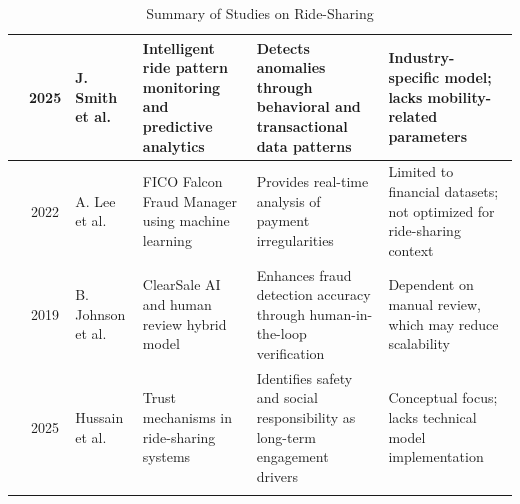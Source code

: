 \begin{longtable}{|c|c|l|
>{\raggedright\arraybackslash}p{3.2cm}|
>{\raggedright\arraybackslash}p{3.5cm}|
>{\raggedright\arraybackslash}p{3.5cm}|}
\cite{smith2025} & 2025 & J. Smith et al. &
Intelligent ride pattern monitoring and predictive analytics &
Detects anomalies through behavioral and transactional data patterns &
Industry-specific model; lacks mobility-related parameters \\ \hline

\cite{lee2022} & 2022 & A. Lee et al. &
FICO Falcon Fraud Manager using machine learning &
Provides real-time analysis of payment irregularities &
Limited to financial datasets; not optimized for ride-sharing context \\ \hline

\cite{johnson2019} & 2019 & B. Johnson et al. &
ClearSale AI and human review hybrid model &
Enhances fraud detection accuracy through human-in-the-loop verification &
Dependent on manual review, which may reduce scalability \\ \hline

\cite{hussain2025} & 2025 & Hussain et al. &
Trust mechanisms in ride-sharing systems &
Identifies safety and social responsibility as long-term engagement drivers &
Conceptual focus; lacks technical model implementation \\ \hline
\caption{Summary of Studies on Ride-Sharing}
\end{longtable}
\normalsize
\clearpage



